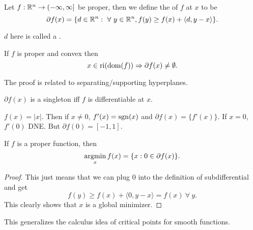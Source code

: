 \documentclass[class=article,crop=false]{standalone}
\begin{document}
 \begin{defn}[subdifferential]
	 Let $ f: \mathbb{R}^{n} \to (-\infty, \infty]$ be proper, then we define the  of $ f$ at $ x$ to be
	 \[
		 \partial f(x) = \{d \in \rr^{n}: \ \forall \ y \in \rr^{n}, f(y) \geq f(x) + \langle d,y-x \rangle\} 
	 .\] 
\end{defn}
\begin{note}
$ d$ here is called a  . 
\end{note}
\begin{thm}
If $ f$ is proper and convex then
 \[
	 x \in \operatorname{ri}(\operatorname{dom}(f)) \Rightarrow \partial f(x) \neq \emptyset
.\] 
\end{thm}
\begin{note}
The proof is related to separating/supporting hyperplanes.
\end{note}
\begin{prop}
	$ \partial f(x) $ is a singleton  iff  $ f$ is differentiable at  $ x$.
\end{prop}

\begin{eg}
	$ f(x) = |x|$. Then if  $ x\neq 0$,  $ f'(x) = \operatorname{sgn}(x)$ and  $ \partial f(x) = \{f'(x)\} $. If $ x=0$,  $ f'(0)$ DNE. But $ \partial f(0) = [-1,1] $.
\end{eg}

\begin{thm}
If $ f$ is a proper function, then
 \[
	 \operatorname*{argmin}_{x} f(x) = \{x: 0 \in \partial f(x)\} 
.\] 
\end{thm}
\begin{proof}
This just means that we can plug $ 0$ into the definition of subdifferential and get
 \[
	 f(y) \geq f(x) + \langle 0, y-x \rangle = f(x) \ \forall \ y
.\] 
This clearly shows that $ x$ is a global minimizer. 
\end{proof}

\begin{note}
This generalizes the calculus idea of critical points for smooth functions.
\end{note}
\end{document}
